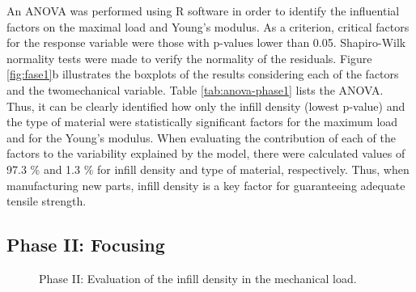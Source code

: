 \documentclass[
  12pt]{article}
\begin{document}
An ANOVA was performed using R software in order to identify the influential factors on the maximal load and Young's modulus.
As a criterion, critical factors for the response variable were those with p-values lower than 0.05.
Shapiro-Wilk normality tests were made to verify the normality of the residuals.
Figure \ref{fig:fase1}b illustrates the boxplots of the results considering each of the factors and the twomechanical variable.
Table \ref{tab:anova-phase1} lists the ANOVA.
Thus, it can be clearly identified how only the infill density (lowest p-value) and the type of material were statistically significant factors for the maximum load and for the Young's modulus.
When evaluating the contribution of each of the factors to the variability explained by the model, there were calculated values of 97.3 \% and 1.3 \% for infill density and type of material, respectively.
Thus, when manufacturing new parts, infill density is a key factor for guaranteeing adequate tensile strength.

\hypertarget{phase-ii-focusing}{%
\subsection{Phase II: Focusing}\label{phase-ii-focusing}}

\begin{figure}[!h]

{\centering {}

}

\caption{Phase II: Evaluation of the infill density in the mechanical load.}\label{fig:phase2}
\end{figure}
\end{document}
